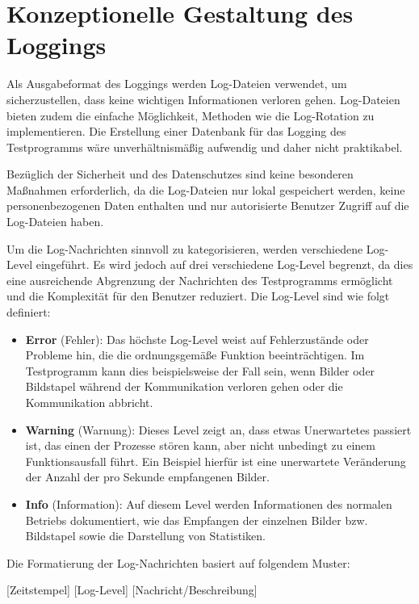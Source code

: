 \section{Konzeptionelle Gestaltung des Loggings}

Als Ausgabeformat des Loggings werden Log-Dateien verwendet, um sicherzustellen, dass keine wichtigen Informationen verloren gehen. Log-Dateien bieten zudem die einfache 
Möglichkeit, Methoden wie die Log-Rotation zu implementieren. Die Erstellung einer Datenbank für das Logging des Testprogramms wäre unverhältnismäßig aufwendig und daher nicht 
praktikabel.

Bezüglich der Sicherheit und des Datenschutzes sind keine besonderen Maßnahmen erforderlich, da die Log-Dateien nur lokal gespeichert werden, keine personenbezogenen Daten enthalten 
und nur autorisierte Benutzer Zugriff auf die Log-Dateien haben.

Um die Log-Nachrichten sinnvoll zu kategorisieren, werden verschiedene Log-Level eingeführt. Es wird jedoch auf drei verschiedene Log-Level begrenzt, da dies eine ausreichende 
Abgrenzung der Nachrichten des Testprogramms ermöglicht und die Komplexität für den Benutzer reduziert. Die Log-Level sind wie folgt definiert:

\begin{itemize}
    \item \textbf{Error} (Fehler): Das höchste Log-Level weist auf Fehlerzustände oder Probleme hin, die die ordnungsgemäße Funktion beeinträchtigen. Im Testprogramm kann dies beispielsweise der Fall sein, wenn Bilder oder Bildstapel während der Kommunikation verloren gehen oder die Kommunikation abbricht.
    \item \textbf{Warning} (Warnung): Dieses Level zeigt an, dass etwas Unerwartetes passiert ist, das einen der Prozesse stören kann, aber nicht unbedingt zu einem Funktionsausfall führt. Ein Beispiel hierfür ist eine unerwartete Veränderung der Anzahl der pro Sekunde empfangenen Bilder.
    \item \textbf{Info} (Information): Auf diesem Level werden Informationen des normalen Betriebs dokumentiert, wie das Empfangen der einzelnen Bilder bzw. Bildstapel sowie die Darstellung von Statistiken.
\end{itemize}

Die Formatierung der Log-Nachrichten basiert auf folgendem Muster: 
\vspace*{-15pt}
\begin{center}
  [Zeitstempel] [Log-Level] [Nachricht/Beschreibung]
\end{center}
\vspace*{-15pt}

